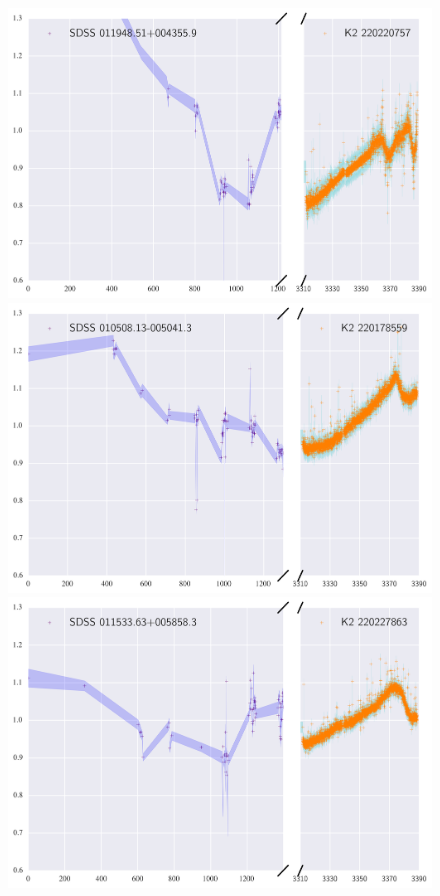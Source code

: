 \documentclass[a4paper,fleqn,usenatbib]{mnras}
\begin{document}
          
          
          
                    \begin{figure}
	\includegraphics[width=\columnwidth]{220220757ExtendedLC.png}
	\includegraphics[width=\columnwidth]{220178559ExtendedLC.png}
	\includegraphics[width=\columnwidth]{220227863ExtendedLC.png}
                    	\caption{}
                    	\label{fig:example_figure}
                    \end{figure}
                    
\end{document}
